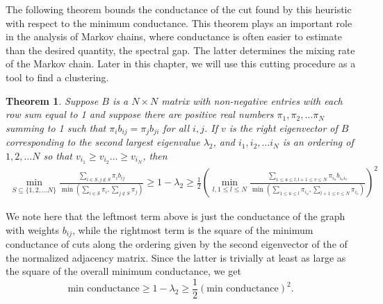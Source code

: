 \documentclass{book}
\newtheorem{theorem}{Theorem}[chapter]
\numberwithin{exercise}{chapter}
\begin{document}
The following theorem bounds the conductance of the cut found by this heuristic
with respect to the minimum conductance. This theorem plays an important role in the analysis of Markov chains, where conductance is often easier to estimate than the desired quantity, the spectral gap. The latter determines the mixing rate of the Markov chain.
Later in this chapter, we will use this cutting procedure as a tool to find a clustering.

\begin{theorem}\label{thm:condineq}
Suppose $B$ is a $N\times N$
matrix with non-negative entries with each row sum equal
to 1 and suppose there are positive real numbers $\pi_1,\pi_2,\ldots \pi_N$
summing to 1 such that $\pi_i b_{ij}=\pi_j b_{ji}$ for all $i,j$. If
$v$ is the right eigenvector of $B$ corresponding to the second
largest eigenvalue $\lambda_2$,
and $i_1,i_2,\ldots i_N$ is an ordering of $1,2,\ldots
N$ so that $v_{i_1}\geq v_{i_2}\ldots \geq v_{i_N}$, then
\begin{eqnarray*}
\min_{S\subseteq \{1,2,\ldots N\}} \frac{\sum\limits_{i\in S,j\notin S}\pi_i b_{ij}}
       {\min (\sum\limits_{i\in S}\pi_i,\sum\limits_{j\notin S} \pi_j)}
 \geq  1-\lambda_2
\geq \frac{1}{2} \left( \min_{l, 1\leq l\leq N}
   \frac{\sum\limits_{1\leq u\leq l; l+1\leq v\leq N}\pi_{i_u}b_{i_u i_v}}
   {\min (\sum\limits_{1\leq u\leq l}\pi_{i_u},\sum\limits_{l+1\leq v\leq N} \pi_{i_v})}\right)^2
\end{eqnarray*}
\end{theorem}

We note here that the leftmost term above is just the conductance of the graph with weights $b_{ij}$, while the rightmost term is the square of the minimum conductance of cuts along the ordering given by the second eigenvector of the of the normalized adjacency matrix. Since the latter is trivially at least as large as the square of the overall minimum conductance, we get
\[
\mbox{min conductance} \ge 1 - \lambda_2 \ge \frac{1}{2} \left(\mbox{min conductance}\right)^2.
\]
\end{document}
